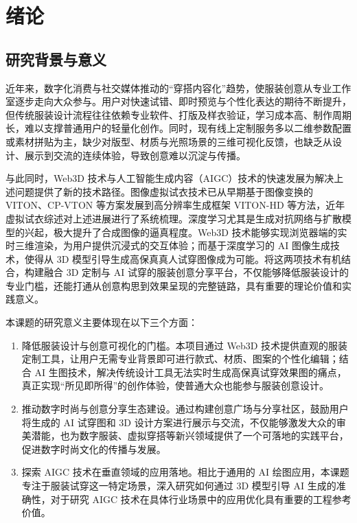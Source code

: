 \documentclass[twoside]{thesis-cls-Miya} %
\begin{document}
\tableofcontents

\mainmatter

\chapter{绪论} %

\section{研究背景与意义}
近年来，数字化消费与社交媒体推动的“穿搭内容化”趋势，使服装创意从专业工作室逐步走向大众参与。用户对快速试错、即时预览与个性化表达的期待不断提升，但传统服装设计流程往往依赖专业软件、打版及样衣验证，学习成本高、制作周期长，难以支撑普通用户的轻量化创作。同时，现有线上定制服务多以二维参数配置或素材拼贴为主，缺少对版型、材质与光照场景的三维可视化反馈，也缺乏从设计、展示到交流的连续体验，导致创意难以沉淀与传播。

与此同时，Web3D 技术与人工智能生成内容（AIGC）技术的快速发展为解决上述问题提供了新的技术路径\cite{yuan2023aigc}。图像虚拟试衣技术已从早期基于图像变换的 VITON\cite{viton_han2018}、CP-VTON\cite{cpvton_wang2018} 等方案发展到高分辨率生成框架 VITON-HD\cite{vitonhd_choi2021} 等方法，近年虚拟试衣综述\cite{zhao2023tryon}对上述进展进行了系统梳理。深度学习\cite{lecun2015deep}尤其是生成对抗网络\cite{gan_goodfellow2020}与扩散模型的兴起，极大提升了合成图像的逼真程度。Web3D 技术能够实现浏览器端的实时三维渲染，为用户提供沉浸式的交互体验；而基于深度学习的 AI 图像生成技术，使得从 3D 模型引导生成高保真真人试穿图像成为可能\cite{garnet_cloth_draping}。将这两项技术有机结合，构建融合 3D 定制与 AI 试穿的服装创意分享平台，不仅能够降低服装设计的专业门槛，还能打通从创意构思到效果呈现的完整链路，具有重要的理论价值和实践意义。

本课题的研究意义主要体现在以下三个方面：
\begin{enumerate}[label=(\arabic*)]
	\item 降低服装设计与创意可视化的门槛。本项目通过 Web3D 技术提供直观的服装定制工具，让用户无需专业背景即可进行款式、材质、图案的个性化编辑；结合 AI 生图技术，解决传统设计工具无法实时生成高保真试穿效果图的痛点，真正实现“所见即所得”的创作体验，使普通大众也能参与服装创意设计。
	\item 推动数字时尚与创意分享生态建设。通过构建创意广场与分享社区，鼓励用户将生成的 AI 试穿图和 3D 设计方案进行展示与交流，不仅能够激发大众的审美潜能，也为数字服装、虚拟穿搭等新兴领域提供了一个可落地的实践平台，促进数字时尚文化的传播与发展。
	\item 探索 AIGC 技术在垂直领域的应用落地。相比于通用的 AI 绘图应用，本课题专注于服装试穿这一特定场景，深入研究如何通过 3D 模型引导 AI 生成的准确性，对于研究 AIGC 技术在具体行业场景中的应用优化具有重要的工程参考价值。
\end{enumerate}
\end{document}
